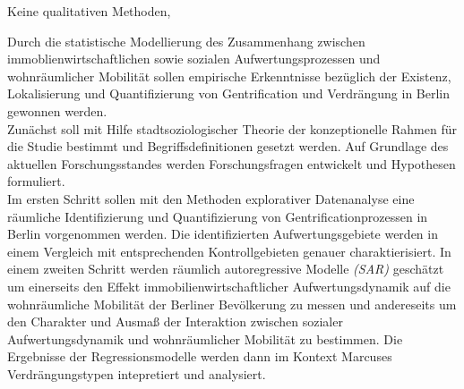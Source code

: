\begin{itemize}
Keine qualitativen Methoden, 

Durch die statistische Modellierung des Zusammenhang zwischen immoblienwirtschaftlichen sowie sozialen Aufwertungsprozessen und wohnräumlicher Mobilität sollen empirische Erkenntnisse bezüglich der Existenz, Lokalisierung und Quantifizierung von Gentrification und Verdrängung in Berlin gewonnen werden. \\
Zunächst soll mit Hilfe stadtsoziologischer Theorie der konzeptionelle Rahmen für die Studie bestimmt und Begriffsdefinitionen gesetzt werden. Auf Grundlage des aktuellen Forschungsstandes werden Forschungsfragen entwickelt und Hypothesen formuliert. \\
Im ersten Schritt sollen mit den Methoden explorativer Datenanalyse eine räumliche Identifizierung und Quantifizierung von Gentrificationprozessen in Berlin vorgenommen werden. Die identifizierten Aufwertungsgebiete werden in einem Vergleich mit entsprechenden Kontrollgebieten genauer charaktierisiert. In einem zweiten Schritt werden räumlich autoregressive Modelle \textit{(\ac{SAR})} geschätzt um einerseits den Effekt immobilienwirtschaftlicher Aufwertungsdynamik auf die wohnräumliche Mobilität der Berliner Bevölkerung zu messen und andereseits um den Charakter und Ausmaß der Interaktion zwischen sozialer Aufwertungsdynamik und wohnräumlicher Mobilität zu bestimmen. Die Ergebnisse der Regressionsmodelle werden dann im Kontext Marcuses Verdrängungstypen intepretiert und analysiert.
\end{itemize}

